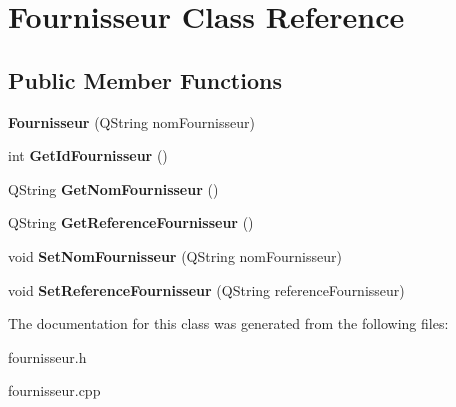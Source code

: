\hypertarget{class_fournisseur}{}\section{Fournisseur Class Reference}
\label{class_fournisseur}
\subsection*{Public Member Functions}
\begin{DoxyCompactItemize}
\item 
\mbox{\label{class_fournisseur_a81aa41d5b1039e9816da11048e1970f4}} 
{\bfseries Fournisseur} (Q\+String nom\+Fournisseur)
\item 
\mbox{\label{class_fournisseur_a72630517bf1b71ffd938bf774f223a56}} 
int {\bfseries Get\+Id\+Fournisseur} ()
\item 
\mbox{\label{class_fournisseur_aead937b32a22c0a46b3e15afb44333e3}} 
Q\+String {\bfseries Get\+Nom\+Fournisseur} ()
\item 
\mbox{\label{class_fournisseur_a44f6572c550378be4aa21302be6bc58a}} 
Q\+String {\bfseries Get\+Reference\+Fournisseur} ()
\item 
\mbox{\label{class_fournisseur_af4b9f8709e2395729b9853a78f6db4fb}} 
void {\bfseries Set\+Nom\+Fournisseur} (Q\+String nom\+Fournisseur)
\item 
\mbox{\label{class_fournisseur_aa0f5a8e72e7394e4d5f886b8ddbab33b}} 
void {\bfseries Set\+Reference\+Fournisseur} (Q\+String reference\+Fournisseur)
\end{DoxyCompactItemize}


The documentation for this class was generated from the following files\+:\begin{DoxyCompactItemize}
\item 
fournisseur.\+h\item 
fournisseur.\+cpp\end{DoxyCompactItemize}
